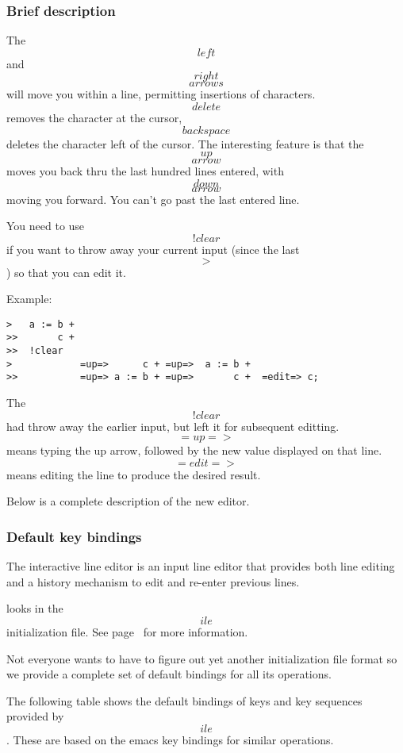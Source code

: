 \subsubsection{Brief description}
The \[left\] and \[right\] \[arrows\] will move you within a line,
permitting insertions of characters.  \[delete\] removes the character
at the cursor, \[backspace\] deletes the character left of the cursor.
The interesting feature is that the \[up\] \[arrow\] moves you back thru
the last hundred lines entered, with \[down\] \[arrow\] moving you forward.
You can't go past the last entered line.


You need to use \[!clear\] if you want to throw away your current input
(since the last \[>\]) so that you can edit it.

\noindent Example:
\begin{verbatim}
>   a := b +
>>       c +
>>  !clear
>            =up=>      c + =up=>  a := b +
>>           =up=> a := b + =up=>       c +  =edit=> c;
\end{verbatim}
The \[!clear\] had \ISETL{} throw away the earlier input, but left it
for subsequent editting.  \[=up=>\] means typing the up arrow, followed
by the new value displayed on that line.  \[=edit=>\] means editing
the line to produce the desired result.

Below is a complete description of the new editor.


\subsubsection{Default key bindings}
     The interactive line editor is an input line 
      editor  that  provides both
     line editing and a history mechanism to edit and re-enter
     previous lines.

     \ISETL{} looks in the \[ile\] initialization file.  See
     page~\pageref{.ini} for more information.

     Not everyone wants to have to figure out  yet  another 
      initialization  file	format	so we provide a complete set of
     default bindings for all its operations.

     The following table shows the default bindings of	keys  and
     key  sequences provided by \[ile\]. These are based on the emacs
     key bindings for similar operations.


